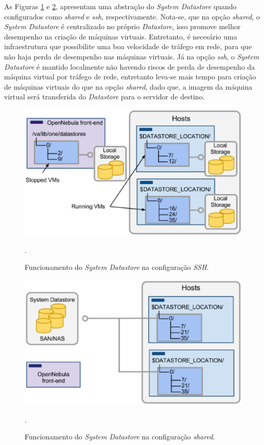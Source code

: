 As Figuras \ref{ssh_datastore} e \ref{shared_datastore}, apresentam uma abstração do \textit{System Datastore} quando configurados como \textit{shared} e \textit{ssh}, respectivamente. Nota-se, que na opção \textit{shared}, o \textit{System Datastore} é centralizado no próprio \textit{Datastore}, isso promove melhor desempenho na criação de máquinas virtuais. Entretanto, é necesário uma infraestrutura que possibilite uma boa velocidade de tráfego em rede, para que não haja perda de desempenho nas máquinas virtuais. Já na opção \textit{ssh}, o \textit{System Datastore} é mantido localmente não havendo riscos de perda de desempenho da máquina virtual por tráfego de rede, entretanto leva-se mais tempo para criação de máquinas virtuais do que na opção \textit{shared}, dado que, a imagem da máquina virtual será transferida do \textit{Datastore} para o servidor de destino.
\begin{figure}[!htb]
\centering
\includegraphics [keepaspectratio=true,scale=0.60]{figuras/ssh_datastore.eps}
\caption{Funcionamento do \textit{System Datastore} na configuração \textit{SSH}.}
\cite{opennebula}.
\label{ssh_datastore}
\end{figure}

\begin{figure}[!htb]
\centering
\includegraphics [keepaspectratio=true,scale=0.60]{figuras/shared_datastore.eps}
\caption{Funcionamento do \textit{System Datastore} na configuração \textit{shared}. }
\cite{opennebula}.
\label{shared_datastore}
\end{figure}

